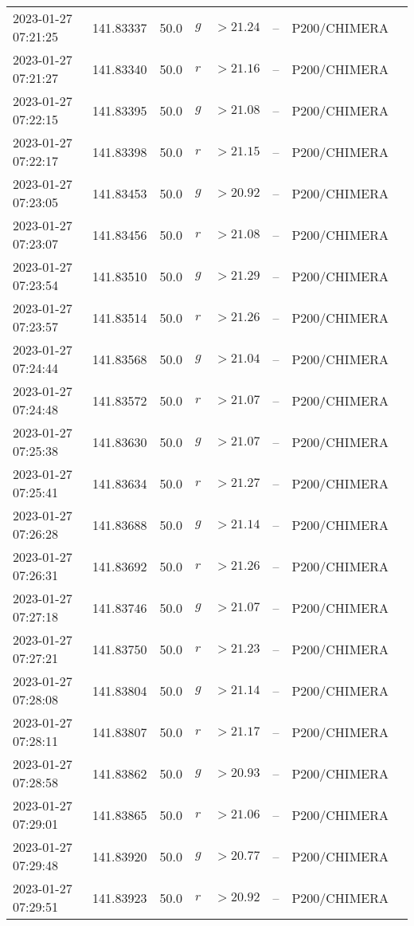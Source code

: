 \documentclass{nature_plusfigure}
\begin{document}
\begin{supplement}
\begin{center}
\begin{longtable}{llllllll}
2023-01-27 07:21:25 & 141.83337 & 50.0 & $g$ & $>21.24$ & -- & P200/CHIMERA &  \\ 
2023-01-27 07:21:27 & 141.83340 & 50.0 & $r$ & $>21.16$ & -- & P200/CHIMERA &  \\ 
2023-01-27 07:22:15 & 141.83395 & 50.0 & $g$ & $>21.08$ & -- & P200/CHIMERA &  \\ 
2023-01-27 07:22:17 & 141.83398 & 50.0 & $r$ & $>21.15$ & -- & P200/CHIMERA &  \\ 
2023-01-27 07:23:05 & 141.83453 & 50.0 & $g$ & $>20.92$ & -- & P200/CHIMERA &  \\ 
2023-01-27 07:23:07 & 141.83456 & 50.0 & $r$ & $>21.08$ & -- & P200/CHIMERA &  \\ 
2023-01-27 07:23:54 & 141.83510 & 50.0 & $g$ & $>21.29$ & -- & P200/CHIMERA &  \\ 
2023-01-27 07:23:57 & 141.83514 & 50.0 & $r$ & $>21.26$ & -- & P200/CHIMERA &  \\ 
2023-01-27 07:24:44 & 141.83568 & 50.0 & $g$ & $>21.04$ & -- & P200/CHIMERA &  \\ 
2023-01-27 07:24:48 & 141.83572 & 50.0 & $r$ & $>21.07$ & -- & P200/CHIMERA &  \\ 
2023-01-27 07:25:38 & 141.83630 & 50.0 & $g$ & $>21.07$ & -- & P200/CHIMERA &  \\ 
2023-01-27 07:25:41 & 141.83634 & 50.0 & $r$ & $>21.27$ & -- & P200/CHIMERA &  \\ 
2023-01-27 07:26:28 & 141.83688 & 50.0 & $g$ & $>21.14$ & -- & P200/CHIMERA &  \\ 
2023-01-27 07:26:31 & 141.83692 & 50.0 & $r$ & $>21.26$ & -- & P200/CHIMERA &  \\ 
2023-01-27 07:27:18 & 141.83746 & 50.0 & $g$ & $>21.07$ & -- & P200/CHIMERA &  \\ 
2023-01-27 07:27:21 & 141.83750 & 50.0 & $r$ & $>21.23$ & -- & P200/CHIMERA &  \\ 
2023-01-27 07:28:08 & 141.83804 & 50.0 & $g$ & $>21.14$ & -- & P200/CHIMERA &  \\ 
2023-01-27 07:28:11 & 141.83807 & 50.0 & $r$ & $>21.17$ & -- & P200/CHIMERA &  \\ 
2023-01-27 07:28:58 & 141.83862 & 50.0 & $g$ & $>20.93$ & -- & P200/CHIMERA &  \\ 
2023-01-27 07:29:01 & 141.83865 & 50.0 & $r$ & $>21.06$ & -- & P200/CHIMERA &  \\ 
2023-01-27 07:29:48 & 141.83920 & 50.0 & $g$ & $>20.77$ & -- & P200/CHIMERA &  \\ 
2023-01-27 07:29:51 & 141.83923 & 50.0 & $r$ & $>20.92$ & -- & P200/CHIMERA &  \\ 

\end{longtable}
\end{center}
\end{supplement}
\end{document}
